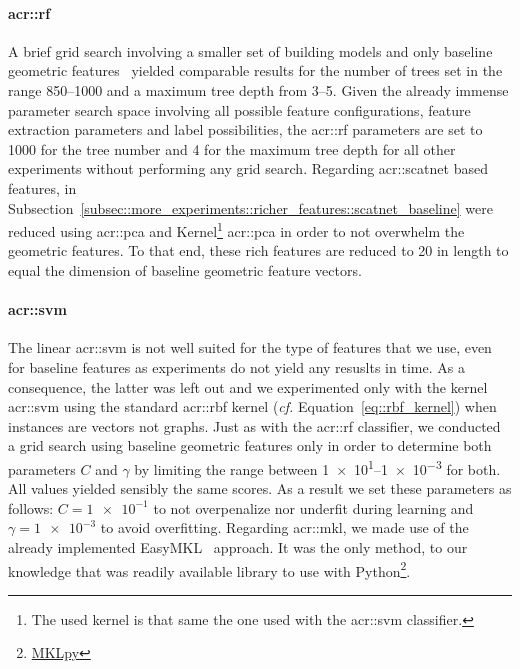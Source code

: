             \paragraph{\acrshort*{acr::rf}}
                A brief grid search involving a smaller set of building models and only baseline geometric features~\parencite{ennafii2018qualificationunannotated} yielded comparable results for the number of trees set in the range \numrange{850}{1000} and a maximum tree depth from \numrange{3}{5}.
                Given the already immense parameter search space involving all possible feature configurations, feature extraction parameters and label possibilities, the \gls{acr::rf} parameters are set to \num{1000} for the tree number and 4 for the maximum tree depth for all other experiments without performing any grid search.
                Regarding \gls{acr::scatnet} based features, in Subsection~\ref{subsec::more_experiments::richer_features::scatnet_baseline} were reduced using \gls{acr::pca} and Kernel\footnote{The used kernel is that same the one used with the \gls{acr::svm} classifier.} \gls{acr::pca} in order to not overwhelm the geometric features.
                To that end, these rich features are reduced to 20 in length to equal the dimension of baseline geometric feature vectors.

            \paragraph{\acrshort*{acr::svm}}
                The linear \gls{acr::svm} is not well suited for the type of features that we use, even for baseline features as experiments do not yield any resuslts in time.
                As a consequence, the latter was left out and we experimented only with the kernel \gls{acr::svm} using the standard \gls{acr::rbf} kernel (\textit{cf.} Equation~\ref{eq::rbf_kernel}) when instances are vectors not graphs.
                Just as with the \gls{acr::rf} classifier, we conducted a grid search using baseline geometric features only in order to determine both parameters \(C\) and \(\gamma\) by limiting the range between \numrange[range-phrase={ and }]{1e1}{1e-3} for both.
                All values yielded sensibly the same scores.
                As a result we set these parameters as follows: \(C = \num{1e-1}\) to not overpenalize nor underfit during learning and \(\gamma = \num{1e-3}\) to avoid overfitting.
                Regarding \gls{acr::mkl}, we made use of the already implemented EasyMKL~\parencite{aiolli2015easymkl} approach.
                It was the only method, to our knowledge that was readily available library to use with Python\footnote{\href{https://github.com/IvanoLauriola/MKLpy}{MKLpy}}.
    
